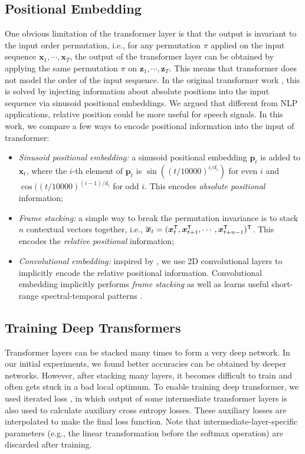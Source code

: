 \documentclass{article}
\begin{document}
\subsection{Positional Embedding}
One obvious limitation of the transformer layer is that the output is invariant to the input order permutation, i.e., for any permutation $\pi$ applied on the input sequence $\boldsymbol{x}_1, \cdots, \boldsymbol{x}_T$, the output of the transformer layer can be obtained by applying the same permutation $\pi$ on $\boldsymbol{z}_1, \cdots, \boldsymbol{z}_T$.  This means that transformer does not model the order of the input sequence. In the original transformer work \cite{vaswani2017attention}, this is solved by injecting information about absolute positions into the input sequence via sinusoid positional embeddings. We argued that different from NLP applications, relative position could be more useful for speech signals. In this work, we compare a few ways to encode positional information into the input of transformer: 

\begin{itemize}
    
    \item \emph{Sinusoid positional embedding:} a sinusoid positional embedding $\boldsymbol{p}_t$ is added to $\boldsymbol{x}_t$, where 
    the $i$-th element of $\boldsymbol{p}_t$ is $\sin((t/10000)^{i/d_i})$ for even $i$ and $\cos((t/10000)^{(i-1)/d_i}$ for odd $i$. This encodes \emph{absolute positional} information;
    \item \emph{Frame stacking:} a simple way to break the permutation invariance is to stack $n$ contextual vectors together, i.e., $\overline{\boldsymbol{x}}_t=(\boldsymbol{x}_t^{\sf T}, \boldsymbol{x}_{t+1}^{\sf T}, \cdots, \boldsymbol{x}_{t+n-1}^{\sf T})^{\sf T}$. This encodes the \emph{relative positional} information; 
    \item \emph{Convolutional  embedding:} inspired by \cite{mohamed2019transformers}, we use 2D convolutional layers to implicitly encode the relative positional information. Convolutional embedding implicitly performs \emph{frame stacking} as well as learns useful short-range spectral-temporal patterns \cite{zhang2017very}.
\end{itemize}



\subsection{Training Deep Transformers}
Transformer layers can be stacked many times to form a very deep network. In our initial experiments, we found better accuracies can be obtained by deeper networks. However, after stacking many layers, it becomes difficult to train and often gets stuck in a bad local optimum. To enable training deep transformer, we used iterated loss 
\cite{Andros2019}, in which output of some intermediate transformer layers is also used to calculate auxiliary cross entropy losses. These auxiliary losses are interpolated to make the final loss function. Note that intermediate-layer-specific parameters (e.g., the linear transformation before the softmax operation) are discarded after training. 
\end{document}
